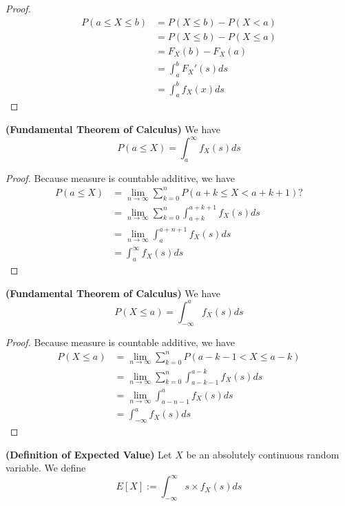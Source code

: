 \documentclass{report}
\begin{document}
\begin{proof}
\begin{align}
  P(a\leq X\leq b)&=P(X\leq b)-P(X<a)\\
&=P(X\leq b)-P(X\leq a)\\
&=F_X(b)-F_X(a)\\
&=\int_a^b F_X'(s)ds\\
&=\int_a^b f_X(x)ds
\end{align}
\end{proof}
\begin{corollary}
\label{2.0.6}
\textbf{(Fundamental Theorem of Calculus)} We have
\begin{equation}
P(a\leq X)=\int_a^\infty f_X(s)ds
\end{equation}
\end{corollary}
\begin{proof}
Because measure is countable additive, we have
\begin{align}
P(a\leq X)&=\lim_{n\to\infty}\sum_{k=0}^n P(a+k\leq X<a+k+1)?\\
&=\lim_{n\to\infty}\sum_{k=0}^n \int_{a+k}^{a+k+1}f_X(s)ds\\
&=\lim_{n\to\infty}\int_a^{a+n+1} f_X(s)ds\\
&=\int_a^\infty f_X(s)ds
\end{align}
\end{proof}
\begin{corollary}
\label{2.0.7}
\textbf{(Fundamental Theorem of Calculus)} We have
\begin{equation}
P(X\leq a)=\int_{-\infty}^a f_X(s)ds
\end{equation}
\end{corollary}
\begin{proof}
Because measure is countable additive, we have
\begin{align}
  P(X\leq a)&=\lim_{n\to\infty}\sum_{k=0}^n P(a-k-1<X\leq a-k)\\
&=\lim_{n\to\infty} \sum_{k=0}^n \int_{a-k-1}^{a-k} f_X(s)ds\\
&=\lim_{n\to\infty} \int^a_{a-n-1}f_X(s)ds\\
&=\int^a_{-\infty}f_X(s)ds
\end{align}
\end{proof}
\begin{definition}
\label{2.0.8}
\textbf{(Definition of Expected Value)} Let $X$ be an absolutely continuous random variable. We define
 \begin{equation}
E[X]:=\int_{-\infty}^\infty s\times f_X(s)ds
\end{equation}
\end{definition}
\end{document}
